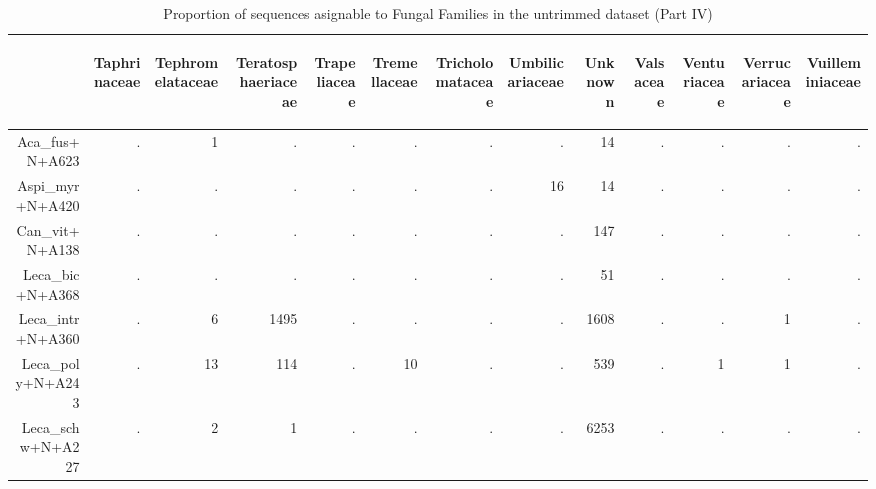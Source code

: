 \documentclass[a4paper, 11]{article}\usepackage[]{graphicx}\usepackage[]{color}
\begin{document}
\begin{table}
\centering
\caption[Families ITS1 IV]{Proportion of sequences asignable to Fungal Families in the untrimmed  dataset (Part IV)} 
\begin{tabular}{rrrrrrrrrrrrr}
  \hline
 & \begin{sideways} Taphrinaceae \end{sideways} & \begin{sideways} Tephromelataceae \end{sideways} & \begin{sideways} Teratosphaeriaceae \end{sideways} & \begin{sideways} Trapeliaceae \end{sideways} & \begin{sideways} Tremellaceae \end{sideways} & \begin{sideways} Tricholomataceae \end{sideways} & \begin{sideways} Umbilicariaceae \end{sideways} & \begin{sideways} Unknown \end{sideways} & \begin{sideways} Valsaceae \end{sideways} & \begin{sideways} Venturiaceae \end{sideways} & \begin{sideways} Verrucariaceae \end{sideways} & \begin{sideways} Vuilleminiaceae \end{sideways} \\ 
  \hline
Aca\_fus+N+A623 & . & 1 & . & . & . & . & . & 14 & . & . & . & . \\ 
  Aspi\_myr+N+A420 & . & . & . & . & . & . & 16 & 14 & . & . & . & . \\ 
  Can\_vit+N+A138 & . & . & . & . & . & . & . & 147 & . & . & . & . \\ 
  Leca\_bic+N+A368 & . & . & . & . & . & . & . & 51 & . & . & . & . \\ 
  Leca\_intr+N+A360 & . & 6 & 1495 & . & . & . & . & 1608 & . & . & 1 & . \\ 
  Leca\_poly+N+A243 & . & 13 & 114 & . & 10 & . & . & 539 & . & 1 & 1 & . \\ 
  Leca\_schw+N+A227 & . & 2 & 1 & . & . & . & . & 6253 & . & . & . & . \\ 

\end{tabular}
\end{table}
\end{document}
